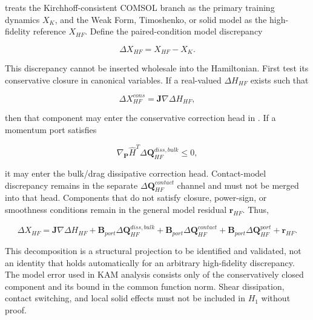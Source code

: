  treats the Kirchhoff-consistent COMSOL branch as the primary training dynamics \(X_{K}\), and the Weak Form, Timoshenko, or solid model as the high-fidelity reference \(X_{HF}\). Define the paired-condition model discrepancy

\begin{equation}
\label{eq:hamiltonian-3-98}
\Delta X_{HF} = X_{HF} - X_{K}.
\end{equation}

This discrepancy cannot be inserted wholesale into the Hamiltonian. First test its conservative closure in canonical variables. If a real-valued \(\Delta H_{HF}\) exists such that

\begin{equation}
\label{eq:hamiltonian-3-99}
\Delta X_{HF}^{cons} = \mathbf{J}\nabla\Delta H_{HF},
\end{equation}

then that component may enter the conservative correction head in . If a momentum port satisfies

\begin{equation}
\label{eq:hamiltonian-3-100}
\nabla_{\mathbf{P}}{\widehat{H}}^{T}\Delta\mathbf{Q}_{HF}^{diss,bulk} \leq 0,
\end{equation}

it may enter the bulk/drag dissipative correction head. Contact-model discrepancy remains in the separate \(\Delta\mathbf{Q}_{HF}^{contact}\) channel and must not be merged into that head. Components that do not satisfy closure, power-sign, or smoothness conditions remain in the general model residual \(\mathbf{r}_{HF}\). Thus,

\begin{equation}
\label{eq:hamiltonian-3-101}
\boxed{\Delta X_{HF} = \mathbf{J}\nabla\Delta H_{HF} + \mathbf{B}_{port}\Delta\mathbf{Q}_{HF}^{diss,bulk} + \mathbf{B}_{port}\Delta\mathbf{Q}_{HF}^{contact} + \mathbf{B}_{port}\Delta\mathbf{Q}_{HF}^{port} + \mathbf{r}_{HF}.}
\end{equation}

This decomposition is a structural projection to be identified and validated, not an identity that holds automatically for an arbitrary high-fidelity discrepancy. The model error used in KAM analysis consists only of the conservatively closed component and its bound in the common function norm. Shear dissipation, contact switching, and local solid effects must not be included in \(H_{1}\) without proof.

